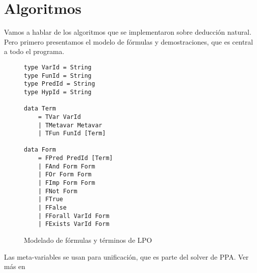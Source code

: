 


\section{Algoritmos}

Vamos a hablar de los algoritmos que se implementaron sobre deducción natural.
Pero primero presentamos el modelo de fórmulas y demostraciones, que es central a todo el programa.

\begin{figure}[H]
\begin{multicols}{2}
\begin{verbatim}
type VarId = String
type FunId = String
type PredId = String
type HypId = String

data Term
    = TVar VarId
    | TMetavar Metavar
    | TFun FunId [Term]

data Form
    = FPred PredId [Term]
    | FAnd Form Form
    | FOr Form Form
    | FImp Form Form
    | FNot Form
    | FTrue
    | FFalse
    | FForall VarId Form
    | FExists VarId Form
\end{verbatim}
\end{multicols}
\caption{Modelado de fórmulas y términos de LPO}
\end{figure}

Las meta-variables se usan para unificación, que es parte del solver de PPA. Ver
más en 

